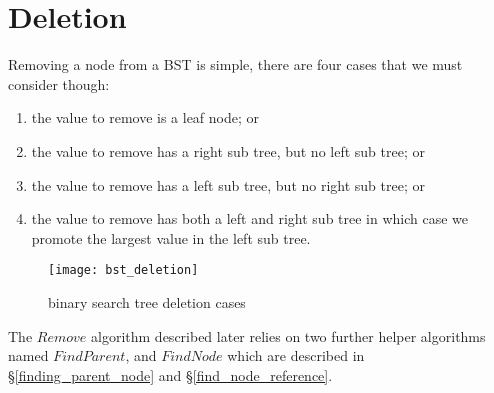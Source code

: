 \section{Deletion}
Removing a node from a BST is simple, there are four cases that we must consider though: 
\begin{enumerate}
\item the value to remove is a leaf node; or
\item the value to remove has a right sub tree, but no left sub tree; or
\item the value to remove has a left sub tree, but no right sub tree; or
\item the value to remove has both a left and right sub tree in which case we promote the largest value in the left sub tree.
\end{enumerate}
\begin{figure}[htp]
\begin{center}
\texttt{[image: bst\_deletion]}
\end{center}
\caption{binary search tree deletion cases} \label{fig:bst_deletion}
\end{figure}

The $Remove$ algorithm described later relies on two further helper algorithms named $FindParent$, and $FindNode$ which are described in \S\ref{finding_parent_node} and \S\ref{find_node_reference}.

